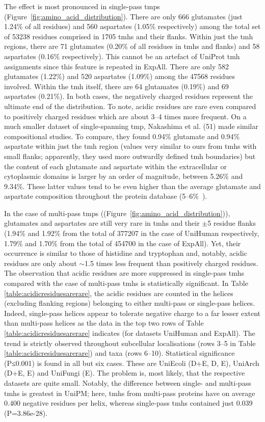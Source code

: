 The effect is most pronounced in single-pass \gls{tmp}s (Figure~\ref{fig:amino_acid_distribution}). There are only 666 glutamates (just 1.24\% of all residues) and 560 aspartates (1.05\% respectively) among the total set of 53238 residues comprised in 1705 \gls{tmh}s and their flanks. Within just the \gls{tmh} regions, there are 71 glutamates (0.20\% of all residues in \gls{tmh}s and flanks) and 58 aspartates (0.16\% respectively). This cannot be an artefact of UniProt \gls{tmh} assignments since this feature is repeated in ExpAll. There are only 582 glutamates (1.22\%) and 520 aspartates (1.09\%) among the 47568 residues involved. Within the \gls{tmh} itself, there are 64 glutamates (0.19\%) and 69 aspartates (0.21\%). In both cases, the negatively charged residues represent the ultimate end of the distribution. To note, acidic residues are rare even compared to positively charged residues which are about 3--4 times more frequent. On a much smaller dataset of single-spanning \gls{tmp}, Nakashima et al. (51) made similar compositional studies. To compare, they found 0.94\% glutamate and 0.94\% aspartate within just the \gls{tmh} region (values very similar to ours from \gls{tmh}s with small flanks; apparently, they used more outwardly defined \gls{tmh} boundaries) but the content of each glutamate and aspartate within the extracellular or cytoplasmic domains is larger by an order of magnitude, between 5.26\% and 9.34\%. These latter values tend to be even higher than the average glutamate and aspartate composition throughout the protein database (5--6\%~\cite{Nakashima1992}).

In the case of multi-pass \gls{tmp}s ((Figure~\ref{fig:amino_acid_distribution})), glutamates and aspartates are still very rare in \gls{tmh}s and their $\pm$5 residue flanks (1.94\% and 1.92\% from the total of 377207 in the case of UniHuman respectively, 1.79\% and 1.70\% from the total of 454700 in the case of ExpAll). Yet, their occurrence is similar to those of histidine and tryptophan and, notably, acidic residues are only about $\sim$1.5 times less frequent than positively charged residues. The observation that acidic residues are more suppressed in single-pass \gls{tmh}s compared with the case of multi-pass \gls{tmh}s is statistically significant. In Table \ref{table:acidicresiduesarerare}, the acidic residues are counted in the helices (excluding flanking regions) belonging to either multi-pass or single-pass helices. Indeed, single-pass helices appear to tolerate negative charge to a far lesser extent than multi-pass helices as the data in the top two rows of Table \ref{table:acidicresiduesarerare} indicates (for datasets UniHuman and ExpAll). The trend is strictly observed throughout subcellular localisations (rows 3--5 in Table \ref{table:acidicresiduesarerare}) and taxa (rows 6--10). Statistical significance (P≤0.001) is found in all but six cases. These are UniEcoli (D+E, D, E), UniArch (D+E, E) and UniFungi (E). The problem is, most likely, that the respective datasets are quite small. Notably, the difference between single- and multi-pass \gls{tmh}s is greatest in UniPM\@; here, \gls{tmh}s from multi-pass proteins have on average 0.400 negative residues per helix, whereas single-pass \gls{tmh}s contained just 0.039 (P=3.86e-28).

